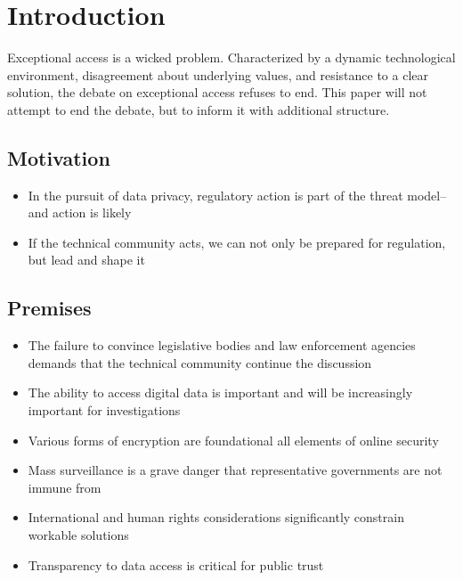 \chapter{Introduction}
\label{chap-introduction}

Exceptional access is a wicked problem. Characterized by a dynamic technological environment, disagreement about
underlying values, and resistance to a clear solution, the debate on exceptional access refuses to end. This paper will
not attempt to end the debate, but to inform it with additional structure.

\section{Motivation}

\begin{itemize}
    \item In the pursuit of data privacy, regulatory action is part of the threat model--and action is likely
    \item If the technical community acts, we can not only be prepared for regulation, but lead and shape it
\end{itemize}

\section{Premises}

\begin{itemize}
    \item The failure to convince legislative bodies and law enforcement agencies demands that the technical community continue the discussion
    \item The ability to access digital data is important and will be increasingly important for investigations
    \item Various forms of encryption are foundational all elements of online security
    \item Mass surveillance is a grave danger that representative governments are not immune from
    \item International and human rights considerations significantly constrain workable solutions
    \item Transparency to data access is critical for public trust
\end{itemize}

